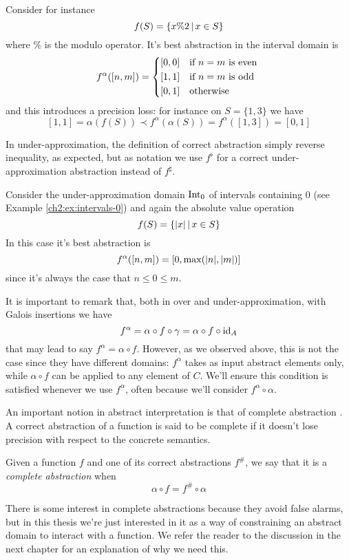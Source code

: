 \begin{example}
	Consider for instance
	\[
	f(S) = \{ x \% 2 \,\vert\, x \in S \}
	\]
	where $\%$ is the modulo operator.
	It's best abstraction in the interval domain is
	\[
	f^{\alpha}([n, m]) = \begin{cases*}
		[0, 0] &if $n = m$ is even \\
		[1, 1] &if $n = m$ is odd \\
		[0, 1] &otherwise
	\end{cases*}
	\]
	and this introduces a precision loss: for instance on $S = \{ 1, 3 \}$ we have
	\[
	[1, 1] = \alpha(f(S)) \prec f^{\alpha}(\alpha(S)) = f^{\alpha}([1, 3]) = [0, 1]
	\]
\end{example}

In under-approximation, the definition of correct abstraction simply reverse inequality, as expected, but as notation we use $f^{\flat}$ for a correct under-approximation abstraction instead of $f^{\sharp}$.
\begin{example}
	Consider the under-approximation domain $\text{Int}_0$ of intervals containing 0 (see Example \ref{ch2:ex:intervals-0}) and again the absolute value operation
	\[
	f(S) = \{ \lvert x\rvert \,\vert\, x \in S \}
	\]
	In this case it's best abstraction is
	\[
	f^{\alpha}([n, m]) = [0, \max(\lvert n\rvert, \lvert m\rvert)]
	\]
	since it's always the case that $n \le 0 \le m$.
\end{example}

It is important to remark that, both in over and under-approximation, with Galois insertions we have
\[
f^{\alpha} = \alpha \circ f \circ \gamma = \alpha \circ f \circ \text{id}_A
\]
that may lead to say $f^{\alpha} = \alpha \circ f$. However, as we observed above, this is not the case since they have different domains: $f^{\alpha}$ takes as input abstract elements only, while $\alpha \circ f$ can be applied to any element of $C$. We'll ensure this condition is satisfied whenever we use $f^{\alpha}$, often because we'll consider $f^{\alpha} \circ \alpha$.

An important notion in abstract interpretation is that of complete abstraction \cite{giacobazzi-making-abstr-complete}. A correct abstraction of a function is said to be complete if it doesn't lose precision with respect to the concrete semantics.
\begin{definition}\label{ch2:def:complete-abstr}
	Given a function $f$ and one of its correct abstractions $f^{\#}$, we say that it is a \textit{complete abstraction} when
	\[
	\alpha \circ f = f^{\#} \circ \alpha
	\]
\end{definition}
There is some interest in complete abstractions \cite{giacobazzi-making-abstr-complete,giacobazzi-analyzing-analyses,bruni-abst-intensionality} because they avoid false alarms, but in this thesis we're just interested in it as a way of constraining an abstract domain to interact with a function. We refer the reader to the discussion in the next chapter for an explanation of why we need this.
